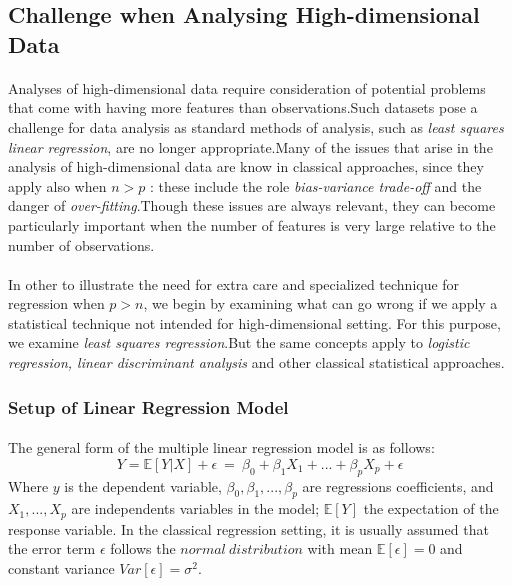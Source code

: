 \documentclass[12pt]{report}
\renewcommand{\emph}{\textit}
\begin{document}
\subsection{Challenge when Analysing High-dimensional Data}
\paragraph*{}
Analyses of high-dimensional data require consideration of potential problems that come with having more features than observations.Such datasets pose a challenge for data analysis as standard methods of analysis, such as \emph{least squares linear regression}, are no longer appropriate.Many of the issues that arise in the analysis of high-dimensional data are know in classical approaches, since they apply also when $n>p$ :
these include the role \emph{bias-variance trade-off} and the danger of \textit{over-fitting}.Though these issues are always relevant, they can become particularly important when the number of features is very large relative to the number of observations.
\paragraph*{}
In other to illustrate the need for extra care and specialized technique for regression when $p>n$, we begin by examining what can go wrong if we apply a statistical technique not intended for high-dimensional setting. For this purpose, we examine \textit{least squares regression}.But the same concepts apply to \emph{logistic regression, linear discriminant analysis} and other classical statistical approaches.


	\subsubsection{Setup of Linear Regression Model}

\paragraph*{}
The general form of the multiple linear regression model is as follows:
\begin{equation}
	Y=\mathbb{E}[Y|X] + \epsilon\ =\ \beta_{0}+\beta_{1}X_{1}+...+ \beta_{p}X_{p} + \epsilon
	\label{f1}
\end{equation}
Where $y$ is the dependent variable, $\beta_{0}, \beta_{1},...,\beta_{p}$ are regressions coefficients, and $X_{1},...,X_{p}$ are independents variables in the model; $\mathbb{E}[Y]$ the expectation of the response variable. In the classical regression setting, it is usually assumed that the error term $\epsilon$ follows the $normal\ distribution$ with mean $\mathbb{E}[\epsilon]=0$ and constant variance $Var[\epsilon]=\sigma^{2}$.
\end{document}
